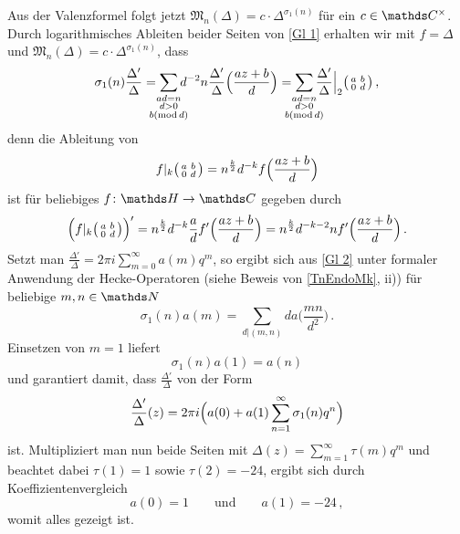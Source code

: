 \begin{bewe}
Aus der Valenzformel folgt jetzt $\mathfrak{M}_n(\Delta) = c \cdot \Delta^{\sigma_1(n)}$ für ein $c \in \CC^\times$. Durch logarithmisches Ableiten beider Seiten von \autoref{Gl 1} erhalten wir mit $f  = \Delta$ und $\mathfrak{M}_n(\Delta) = c \cdot \Delta^{\sigma_1(n)}$, dass
\begin{equation}
\label{Gl 2}
\sigma_1(n) \frac {\Delta'}{\Delta} = \smashoperator{\sum_{\substack{ad = n\\ d > 0\\ b (\operatorname{mod} d)}}} d^{-2}n \frac{\Delta'}{\Delta} \Bigl( \frac{az+b}{d} \Bigr) = \smashoperator{\sum_{\substack{ad = n\\ d > 0\\ b (\operatorname{mod} d)}}} \frac{\Delta'}{\Delta} \Big|_2 \mymat{a}{b}{0}{d}
\,,
\end{equation}
denn die Ableitung von
\[
f |_k \mymat{a}{b}{0}{d} = n^{\frac k2} d^{-k} f\Bigl( \frac{az+b}{d} \Bigr)
\]
ist für beliebiges $f \colon \HH \to \CC$ gegeben durch
\[
\Bigl(f |_k \mymat{a}{b}{0}{d}\Bigr)' = n^{\frac k2} d^{-k} \frac ad f' \Bigl( \frac{az+b}{d} \Bigr) = n^{\frac k2} d^{-k-2} n f'\Bigl( \frac{az+b}{d} \Bigr)
\,.
\]
Setzt man $\frac{\Delta'}{\Delta} = 2\pi i \sum_{m=0}^\infty a(m) q^m$, so ergibt sich aus \autoref{Gl 2} unter formaler Anwendung der Hecke-Operatoren (siehe Beweis von \autoref{TnEndoMk}, ii)) für beliebige $m,n \in \NN$
\[
\sigma_1(n) a(m) = \sum_{d\vert(m,n)} d a\bigl( \frac{mn}{d^2} \bigr)
\,.
\]
Einsetzen von $m = 1$ liefert
\[
\sigma_1(n) a(1) = a(n)
\]
und garantiert damit, dass $\frac{\Delta'}{\Delta}$ von der Form
\[
\frac{\Delta'}{\Delta}(z) = 2\pi i \Bigl( a(0) + a(1) \sum_{n=1}^\infty \sigma_1(n) q^n \Bigr)
\]
ist. Multipliziert man nun beide Seiten mit $\Delta(z) = \sum_{m=1}^\infty \tau(m) q^m$ und beachtet dabei $\tau(1) = 1$ sowie $\tau(2) = -24$, ergibt sich durch Koeffizientenvergleich
\[
a(0) = 1 \qquad \text{und} \qquad a(1) = -24
\,,
\]
womit alles gezeigt ist.
\end{bewe}




